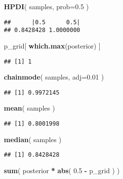\documentclass[
]{book}
\newenvironment{Shaded}{\begin{snugshade}}{\end{snugshade}}
\newcommand{\DataTypeTok}[1]{\textcolor[rgb]{0.13,0.29,0.53}{#1}}
\newcommand{\FloatTok}[1]{\textcolor[rgb]{0.00,0.00,0.81}{#1}}
\newcommand{\KeywordTok}[1]{\textcolor[rgb]{0.13,0.29,0.53}{\textbf{#1}}}
\newcommand{\NormalTok}[1]{#1}
\newcommand{\OperatorTok}[1]{\textcolor[rgb]{0.81,0.36,0.00}{\textbf{#1}}}
\newcommand{\StringTok}[1]{\textcolor[rgb]{0.31,0.60,0.02}{#1}}
\begin{document}
\begin{Shaded}
\begin{Highlighting}[]
\KeywordTok{HPDI}\NormalTok{( samples, }\DataTypeTok{prob=}\FloatTok{0.5}\NormalTok{ )}
\end{Highlighting}
\end{Shaded}

\begin{verbatim}
##      |0.5      0.5| 
## 0.8428428 1.0000000
\end{verbatim}

\begin{Shaded}
\begin{Highlighting}[]
\NormalTok{p_grid[ }\KeywordTok{which.max}\NormalTok{(posterior) ]}
\end{Highlighting}
\end{Shaded}

\begin{verbatim}
## [1] 1
\end{verbatim}

\begin{Shaded}
\begin{Highlighting}[]
\KeywordTok{chainmode}\NormalTok{( samples, }\DataTypeTok{adj=}\FloatTok{0.01}\NormalTok{ )}
\end{Highlighting}
\end{Shaded}

\begin{verbatim}
## [1] 0.9972145
\end{verbatim}

\begin{Shaded}
\begin{Highlighting}[]
\KeywordTok{mean}\NormalTok{( samples )}
\end{Highlighting}
\end{Shaded}

\begin{verbatim}
## [1] 0.8001998
\end{verbatim}

\begin{Shaded}
\begin{Highlighting}[]
\KeywordTok{median}\NormalTok{( samples )}
\end{Highlighting}
\end{Shaded}

\begin{verbatim}
## [1] 0.8428428
\end{verbatim}

\begin{Shaded}
\begin{Highlighting}[]
\KeywordTok{sum}\NormalTok{( posterior }\OperatorTok{*}\StringTok{ }\KeywordTok{abs}\NormalTok{( }\FloatTok{0.5} \OperatorTok{-}\StringTok{ }\NormalTok{p_grid ) )}
\end{Highlighting}
\end{Shaded}
\end{document}
